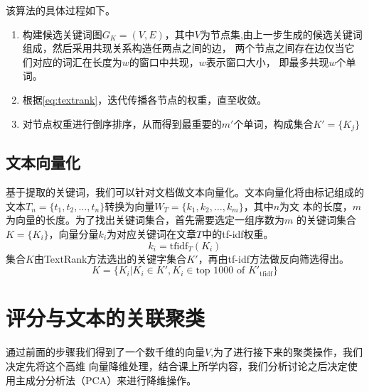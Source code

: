 该算法的具体过程如下。
\begin{enumerate}
    \item 构建候选关键词图$G_K = (V,E)$，其中$V$为节点集,由上一步生成的候选关键词组成，然后采用共现关系构造任两点之间的边，
    两个节点之间存在边仅当它们对应的词汇在长度为$w$的窗口中共现，$w$表示窗口大小，
    即最多共现$w$个单词。
    \item 根据\autoref{eq:textrank}，迭代传播各节点的权重，直至收敛。
    \item 对节点权重进行倒序排序，从而得到最重要的$m'$个单词，构成集合$K'=\{K_j\}$
\end{enumerate}






\subsection{文本向量化}

基于提取的关键词，我们可以针对文档做文本向量化。文本向量化将由标记组成的
文本$T_n=\{t_1,t_2,\ldots,t_n\}$转换为向量$W_T=\{k_1,k_2,\ldots,k_m\}$，其中$n$为文
本的长度，$m$为向量的长度。为了找出关键词集合，首先需要选定一组序数为$m$
的关键词集合$K=\{K_i\}$，向量分量$k_i$为对应关键词在文章$T$中的tf-idf权重。
\begin{equation}
    k_i = \textrm{tfidf}_T(K_i)
\end{equation}
集合$K$由TextRank方法选出的关键字集合$K'$，再由tf-idf方法做反向筛选得出。
\begin{equation}
    K = \{K_i | K_i \in K', K_i \in \textrm{top 1000 of }K'_{\textrm{tfidf}} \}
\end{equation}

\section{评分与文本的关联聚类}
通过前面的步骤我们得到了一个数千维的向量$V$,为了进行接下来的聚类操作，我们决定先将这个高维
向量降维处理，结合课上所学内容，我们分析讨论之后决定使用主成分分析法（PCA）来进行降维操作。

